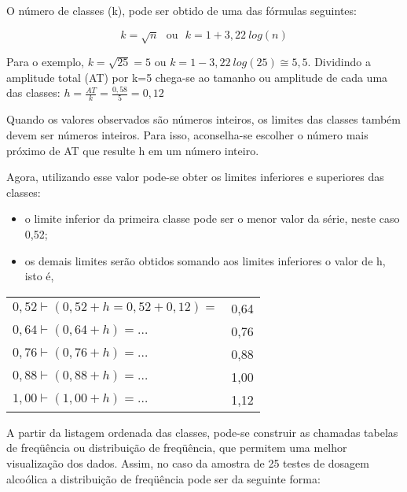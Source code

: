 O número de classes (k), pode ser obtido de uma das fórmulas seguintes:

$$ k=\sqrt{n} \ \ \ \mbox{ou} \ \ \  k=1+3,22 \ log(n)$$



Para o exemplo, $k=\sqrt{25}=5$ ou $k=1-3,22 \ log(25)\cong 5,5$. Dividindo a amplitude total (AT) por k=5 chega-se ao tamanho ou amplitude de cada uma das classes: $h=\frac{AT}{k}=\frac{0,58}{5}=0,12$\vskip0.3cm


Quando os valores observados são números inteiros, os limites das classes também devem ser números inteiros. Para isso, aconselha-se escolher o número mais próximo de AT que resulte h em um número inteiro.\vskip0.3cm


Agora, utilizando esse valor pode-se obter os limites inferiores e superiores das classes:



\begin{itemize}
  \item o limite inferior da primeira classe pode ser o menor valor da série, neste caso 0,52;
  \item os demais limites serão obtidos somando aos limites inferiores o valor de h, isto é,
\end{itemize}

\begin{table}[!htb]
    \centering
    {
    \label{}
    \vspace{-0.5cm}
\begin{tabular}{l|c}
\hline\hline  
  $0,52 \vdash (0,52+ h=0,52+0,12)=$ & 0,64 \\
  $0,64 \vdash (0,64+ h)= \ldots $   & 0,76 \\
  $0,76 \vdash (0,76+ h)= \ldots $   & 0,88 \\
  $0,88 \vdash (0,88+ h)= \ldots $   & 1,00 \\
  $1,00 \vdash (1,00+ h)= \ldots $   & 1,12 \\
\hline\hline    
\end{tabular}}
\end{table}

\newpage

A partir da listagem ordenada das classes, pode-se construir
as chamadas tabelas de freqüência ou distribuição
de freqüência, que permitem uma melhor visualização dos dados.
Assim, no caso da amostra de 25 testes de dosagem alcoólica 
a distribuição de freqüência pode ser da seguinte forma:



